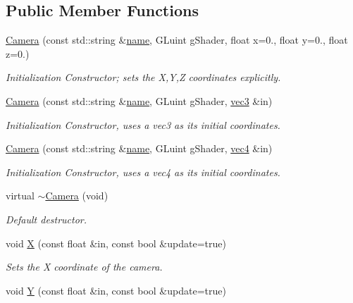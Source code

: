 \subsection*{Public Member Functions}
\begin{DoxyCompactItemize}
\item 
\hyperlink{class_camera_a16516fa8c830cecef5c8eb43eff12783}{Camera} (const std\-::string \&\hyperlink{class_object_a24457e0a387492c80594aec7681a2277}{name}, G\-Luint g\-Shader, float x=0., float y=0., float z=0.)
\begin{DoxyCompactList}\small\item\em Initialization Constructor; sets the X,Y,Z coordinates explicitly. \end{DoxyCompactList}\item 
\hyperlink{class_camera_a24329612384948d2b64f78094fe84e75}{Camera} (const std\-::string \&\hyperlink{class_object_a24457e0a387492c80594aec7681a2277}{name}, G\-Luint g\-Shader, \hyperlink{struct_angel_1_1vec3}{vec3} \&in)
\begin{DoxyCompactList}\small\item\em Initialization Constructor, uses a vec3 as its initial coordinates. \end{DoxyCompactList}\item 
\hyperlink{class_camera_aa131bc7f1bad2cc8baea463714c4485d}{Camera} (const std\-::string \&\hyperlink{class_object_a24457e0a387492c80594aec7681a2277}{name}, G\-Luint g\-Shader, \hyperlink{struct_angel_1_1vec4}{vec4} \&in)
\begin{DoxyCompactList}\small\item\em Initialization Constructor, uses a vec4 as its initial coordinates. \end{DoxyCompactList}\item 
virtual \hyperlink{class_camera_a06211f202c145b3ec8253f96e1e654a6}{$\sim$\-Camera} (void)
\begin{DoxyCompactList}\small\item\em Default destructor. \end{DoxyCompactList}\item 
void \hyperlink{class_camera_a7ff7cf14bee873ac6cda7b2e42a60358}{X} (const float \&in, const bool \&update=true)
\begin{DoxyCompactList}\small\item\em Sets the X coordinate of the camera. \end{DoxyCompactList}\item 
void \hyperlink{class_camera_a69af560bb7f85db3a5062d1a6b3927bf}{Y} (const float \&in, const bool \&update=true)

\end{DoxyCompactItemize}
